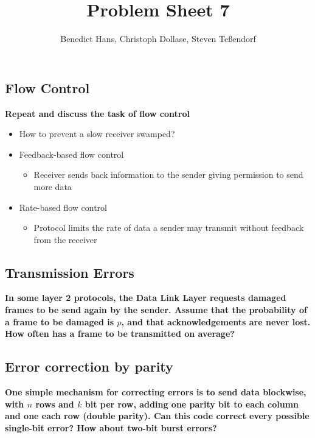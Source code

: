\documentclass[a4paper,12pt]{article}
\author{Benedict Hans, Christoph Dollase, Steven Te\ss endorf}
\title{ \textbf{Problem Sheet 7}}
\begin{document}
	 
	\maketitle	 %
	
	\subsection{Flow Control}
	\textbf{Repeat and discuss the task of flow control}
	
	\begin{itemize}
		\item How to prevent a slow receiver swamped?
		\item Feedback-based flow control
		\begin{itemize}
			\item Receiver sends back information to the sender giving permission to send more data
		\end{itemize}
		\item Rate-based flow control
		\begin{itemize}
			\item Protocol limits the rate of data a sender may transmit without feedback from the 
			receiver
		\end{itemize}
	\end{itemize}
	
	\subsection{Transmission Errors}
	\textbf{In some layer 2 protocols, the Data Link Layer requests damaged frames to be send again by the sender. Assume that the probability of a frame to be damaged is $p$, and that acknowledgements are never lost.  How often has a frame to be transmitted on average?}
	
	
	
	\subsection{Error correction by parity}
	\textbf{One simple mechanism for correcting errors is to send data blockwise, with	$n$ rows and $k$ bit per row, adding one parity bit to each column and one each row (double parity).  Can this code correct every possible single-bit error? How about two-bit burst errors?}
	
\end{document}

